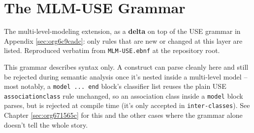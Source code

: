 \documentclass[11pt,twoside,a4paper]{book}
\begin{document}
\chapter{The MLM-USE Grammar}
\label{sec:org18e3b8a}
The multi-level-modeling extension, as a \textbf{delta} on top of the USE
grammar in Appendix \ref{sec:org6c9cadc}: only rules that are new or
changed at this layer are listed. Reproduced verbatim from
\texttt{MLM-USE.ebnf} at the repository root.

This grammar describes syntax only. A construct can parse cleanly here
and still be rejected during semantic analysis once it's nested inside a
multi-level model -- most notably, a \texttt{model ... end} block's classifier
list reuses the plain USE \texttt{associationclass} rule unchanged, so an
association class inside a \texttt{model} block parses, but is rejected at
compile time (it's only accepted in \texttt{inter-classes}). See Chapter
\ref{sec:org671565c} for this and the other cases where the
grammar alone doesn't tell the whole story.
\end{document}

